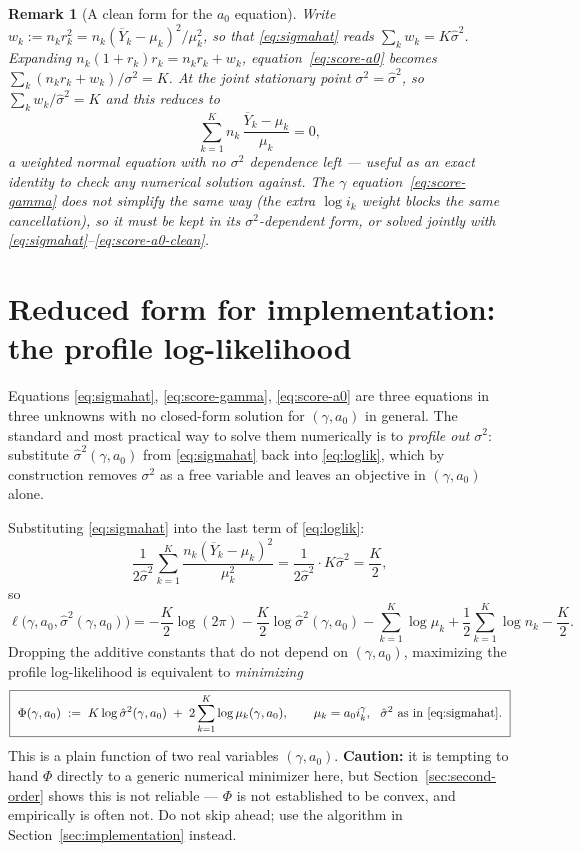 \documentclass[11pt]{article}
\newtheorem{remark}{Remark}
\begin{document}
\begin{remark}[A clean form for the $a_0$ equation]
Write $w_k := n_k r_k^2 = n_k(\overline{Y}_k-\mu_k)^2/\mu_k^2$, so that
\eqref{eq:sigmahat} reads $\sum_k w_k = K\hat\sigma^2$. Expanding
$n_k(1+r_k)r_k = n_k r_k + w_k$, equation~\eqref{eq:score-a0} becomes
$\sum_k (n_k r_k + w_k)/\sigma^2 = K$. At the joint stationary point
$\sigma^2=\hat\sigma^2$, so $\sum_k w_k/\hat\sigma^2 = K$ and this reduces to
\begin{equation}
\label{eq:score-a0-clean}
  \sum_{k=1}^K n_k\,\frac{\overline{Y}_k - \mu_k}{\mu_k} = 0,
\end{equation}
a weighted normal equation with no $\sigma^2$ dependence left --- useful as an
exact identity to check any numerical solution against. The $\gamma$
equation~\eqref{eq:score-gamma} does \emph{not} simplify the same way (the
extra $\log i_k$ weight blocks the same cancellation), so it must be kept in
its $\sigma^2$-dependent form, or solved jointly with
\eqref{eq:sigmahat}--\eqref{eq:score-a0-clean}.
\end{remark}

\section{Reduced form for implementation: the profile log-likelihood}

Equations \eqref{eq:sigmahat}, \eqref{eq:score-gamma}, \eqref{eq:score-a0} are
three equations in three unknowns with no closed-form solution for
$(\gamma, a_0)$ in general. The standard and most practical way to solve them
numerically is to \emph{profile out} $\sigma^2$: substitute
$\hat\sigma^2(\gamma,a_0)$ from \eqref{eq:sigmahat} back into
\eqref{eq:loglik}, which by construction removes $\sigma^2$ as a free
variable and leaves an objective in $(\gamma, a_0)$ alone.

Substituting \eqref{eq:sigmahat} into the last term of \eqref{eq:loglik}:
\[
  \frac{1}{2\hat\sigma^2}\sum_{k=1}^K \frac{n_k(\overline{Y}_k-\mu_k)^2}{\mu_k^2}
  = \frac{1}{2\hat\sigma^2}\cdot K\hat\sigma^2 = \frac{K}{2},
\]
so
\[
  \ell\big(\gamma, a_0, \hat\sigma^2(\gamma,a_0)\big)
  = -\frac{K}{2}\log(2\pi) - \frac{K}{2}\log\hat\sigma^2(\gamma,a_0)
    - \sum_{k=1}^K \log \mu_k + \frac{1}{2}\sum_{k=1}^K \log n_k - \frac{K}{2}.
\]
Dropping the additive constants that do not depend on $(\gamma, a_0)$,
maximizing the profile log-likelihood is equivalent to \emph{minimizing}
\begin{equation}
\label{eq:objective}
  \boxed{\
  \Phi(\gamma, a_0) \;:=\; K \log \hat\sigma^2(\gamma, a_0) \;+\; 2\sum_{k=1}^K \log \mu_k(\gamma, a_0),
  \qquad \mu_k = a_0 i_k^\gamma,\ \ \hat\sigma^2 \text{ as in \eqref{eq:sigmahat}}.
  \ }
\end{equation}
This is a plain function of two real variables $(\gamma, a_0)$.
\textbf{Caution:} it is tempting to hand $\Phi$ directly to a generic
numerical minimizer here, but Section~\ref{sec:second-order} shows this is
not reliable --- $\Phi$ is not established to be convex, and empirically is
often not. Do not skip ahead; use the algorithm in
Section~\ref{sec:implementation} instead.
\end{document}
